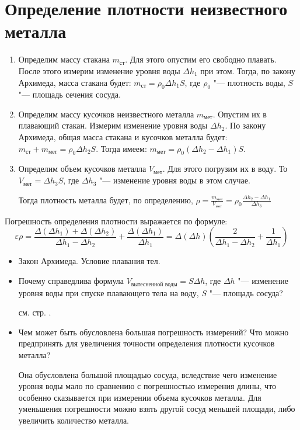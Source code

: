 \section{Определение плотности неизвестного металла}
\SolveVariant
\begin{enumerate}
  \item Определим массу стакана \(m_\text{ст}\). Для этого опустим его свободно плавать. После этого измерим изменение уровня воды \(\Delta h_1\) при этом. Тогда, по закону Архимеда, масса стакана будет: \(m_\text{ст} = \rho_0 \Delta h_1 S\), где \( \rho_0 \) "--- плотность воды, \(S\) "--- площадь сечения сосуда.
  \item Определим массу кусочков неизвестного металла \(m_\text{мет}\). Опустим их в плавающий стакан. Измерим изменение уровня воды \(\Delta h_2\). По закону Архимеда, общая масса стакана и кусочков металла будет: \(m_\text{ст} + m_\text{мет} = \rho_0 \Delta h_2 S\). Тогда имеем: \( m_\text{мет} = \rho_0 (\Delta h_2 - \Delta h_1) S\).
  \item Определим объем кусочков металла \(V_\text{мет}\). Для этого погрузим их в воду. То \(V_\text{мет}=\Delta h_3 S\), где \(\Delta h_3\) "--- изменение уровня воды в этом случае.\par
  Тогда плотность металла будет, по определению, \(\rho = \frac{m_\text{мет}}{V_\text{мет}} = \rho_0 \frac{\Delta h_2 - \Delta h_1}{\Delta h_3}\)
\end{enumerate}
\MesErrors
Погрешность определения плотности выражается по формуле:
\begin{equation*}
\varepsilon \rho = \frac{\Delta(\Delta h_1)+\Delta(\Delta h_2)}{\Delta h_1 - \Delta h_2} + \frac{\Delta(\Delta h_1)}{\Delta h_1}= \Delta(\Delta h) \left(\frac{2}{\Delta h_1 - \Delta h_2} + \frac{1}{\Delta h_1} \right)
\end{equation*}
\SchoolBase
\begin{itemize}
  \item Закон Архимеда. Условие плавания тел.
\end{itemize}
\AdditionalQuestions
\begin{itemize}
  \item Почему справедлива формула \(V_\text{вытесненной воды} = S\Delta h\), где \(\Delta h\) "--- изменение уровня воды при спуске плавающего тела на воду, \(S\) "--- площадь сосуда?\par
  \Answer см. стр. \pageref{ans:9kl2:vol}.
  \item Чем может быть обусловлена большая погрешность измерений? Что можно предпринять для увеличения точности определения плотности кусочков металла?\par
  \Answer Она обусловлена большой площадью сосуда, вследствие чего изменение уровня воды мало по сравнению с погрешностью измерения длины, что особенно сказывается при измерении объема кусочков металла. Для уменьшения погрешности можно взять другой сосуд меньшей площади, либо увеличить количество металла.
\end{itemize}
